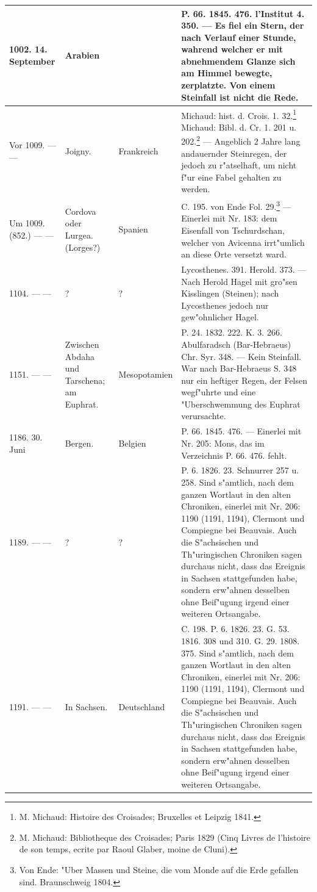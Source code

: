 \documentclass[a4paper, 8pt, oneside, polutonikogreek, german]{article}
\begin{document}
\begin{center}
\begin{longtable}{| p{20mm} | p{25mm} | p{20mm} | p{55mm} |}
        1002. 14. September & Arabien & ~ & P. 66. 1845. 476. l'Institut 4. 350. --- Es fiel ein Stern, der nach Verlauf einer Stunde, wahrend welcher er mit abnehmendem Glanze sich am Himmel bewegte, zerplatzte. Von einem Steinfall ist nicht die Rede. \\ \hline
        Vor 1009. --- --- & Joigny. & Frankreich & Michaud: hist. d. Crois. 1. 32.\footnote{M. Michaud: Histoire des Croisades; Bruxelles et Leipzig 1841.} Michaud: Bibl. d. Cr. 1. 201 u. 202.\footnote{M. Michaud: Bibliotheque des Croisades; Paris 1829 (Cinq Livres de l'histoire de son temps, ecrite par Raoul Glaber, moine de Cluni).} --- Angeblich 2 Jahre lang andauernder Steinregen, der jedoch zu r"atselhaft, um nicht f"ur eine Fabel gehalten zu werden. \\ \hline
        Um 1009. (852.) --- --- & Cordova oder Lurgea. (Lorges?) & Spanien & C. 195. von Ende Fol. 29.\footnote{Von Ende: "Uber Massen und Steine, die vom Monde auf die Erde gefallen sind. Braunschweig 1804.} --- Einerlei mit Nr. 183: dem Eisenfall von Tschurdschan, welcher von Avicenna irrt"umlich an diese Orte versetzt ward. \\ \hline
        1104. --- --- & ? & ? & Lycosthenes. 391. Herold. 373. --- Nach Herold Hagel mit gro"sen Kisslingen (Steinen); nach Lycosthenes jedoch nur gew"ohnlicher Hagel. \\ \hline
        1151. --- --- & Zwischen Abdaha und Tarschena; am Euphrat. & Mesopotamien & P. 24. 1832. 222. K. 3. 266. Abulfaradsch (Bar-Hebraeus) Chr. Syr. 348. --- Kein Steinfall. War nach Bar-Hebraeus S. 348 nur ein heftiger Regen, der Felsen wegf"uhrte und eine "Uberschwemmung des Euphrat verursachte. \\ \hline
        1186. 30. Juni & Bergen. & Belgien & P. 66. 1845. 476. --- Einerlei mit Nr. 205: Mons, das im Verzeichnis P. 66. 476. fehlt. \\ \hline
        1189. --- --- & ? & ? & P. 6. 1826. 23. Schnurrer 257 u. 258. Sind s"amtlich, nach dem ganzen Wortlaut in den alten Chroniken, einerlei mit Nr. 206: 1190 (1191, 1194), Clermont und Compiegne bei Beauvais. Auch die S"achsischen und Th"uringischen Chroniken sagen durchaus nicht, dass das Ereignis in Sachsen stattgefunden habe, sondern erw"ahnen desselben ohne Beif"ugung irgend einer weiteren Ortsangabe. \\ \hline
        1191. --- --- & In Sachsen. & Deutschland & C. 198. P. 6. 1826. 23. G. 53. 1816. 308 und 310. G. 29. 1808. 375. Sind s"amtlich, nach dem ganzen Wortlaut in den alten Chroniken, einerlei mit Nr. 206: 1190 (1191, 1194), Clermont und Compiegne bei Beauvais. Auch die S"achsischen und Th"uringischen Chroniken sagen durchaus nicht, dass das Ereignis in Sachsen stattgefunden habe, sondern erw"ahnen desselben ohne Beif"ugung irgend einer weiteren Ortsangabe. \\ \hline

\end{longtable}
\end{center}
\end{document}
